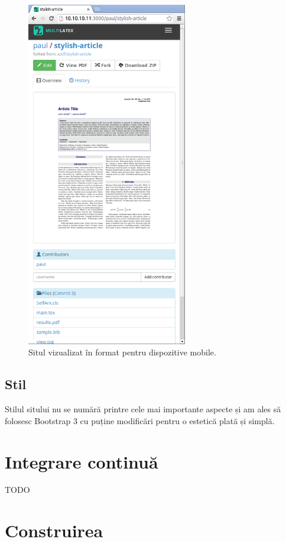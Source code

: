 \documentclass[a4wide,12pt]{report}
\newcommand{\idee}[1]{{\color{red} #1}}
\begin{document}
\begin{figure}
\begin{center}
\includegraphics[width=7cm]{imagini/mobile}
\end{center}
\caption{Situl vizualizat în format pentru dispozitive mobile.}
\label{mobilesitefig}
\end{figure}

\subsection{Stil}

Stilul sitului nu se numără printre cele mai importante aspecte și am ales să
folosesc Bootstrap 3 cu puține modificări pentru o estetică plată și simplă.

\section{Integrare continuă}

\idee{TODO}

\section{Construirea}
\end{document}
